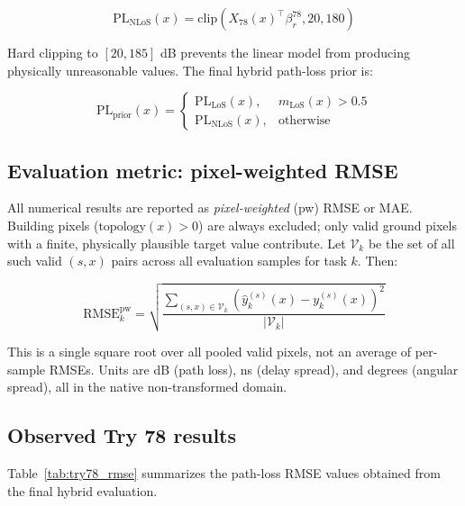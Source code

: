 \documentclass[11pt,a4paper]{article}
\begin{document}
\begin{equation}
\mathrm{PL}_{\mathrm{NLoS}}(x)
=
\mathrm{clip}\!\left(
X_{78}(x)^\top \beta^{78}_{r},
20,
180
\right)
\label{eq:pl_nlos_final}
\end{equation}

Hard clipping to $[20, 185]$ dB prevents the linear model from producing
physically unreasonable values. The final hybrid path-loss prior is:

\begin{equation}
\mathrm{PL}_{\mathrm{prior}}(x)
=
\begin{cases}
\mathrm{PL}_{\mathrm{LoS}}(x), & m_{\mathrm{LoS}}(x) > 0.5 \\
\mathrm{PL}_{\mathrm{NLoS}}(x), & \text{otherwise}
\end{cases}
\label{eq:pl_hybrid}
\end{equation}

\subsection{Evaluation metric: pixel-weighted RMSE}

\label{sec:pw_metric}

All numerical results are reported as \emph{pixel-weighted} (pw) RMSE or MAE.
Building pixels ($\mathrm{topology}(x) > 0$) are always excluded; only valid
ground pixels with a finite, physically plausible target value contribute.
Let $\mathcal{V}_k$ be the set of all such valid $(s, x)$ pairs across all
evaluation samples for task $k$. Then:

\begin{equation}
\mathrm{RMSE}^{\mathrm{pw}}_k
=
\sqrt{
  \frac{\displaystyle\sum_{(s,x)\in\mathcal{V}_k}
  \left(\hat{y}_k^{(s)}(x) - y_k^{(s)}(x)\right)^2}
  {\displaystyle|\mathcal{V}_k|}
}
\label{eq:rmse_pw}
\end{equation}

This is a single square root over all pooled valid pixels, not an average of
per-sample RMSEs. Units are dB (path loss), ns (delay spread), and
degrees (angular spread), all in the native non-transformed domain.

\subsection{Observed Try 78 results}

Table~\ref{tab:try78_rmse} summarizes the path-loss RMSE values obtained from
the final hybrid evaluation.
\end{document}
